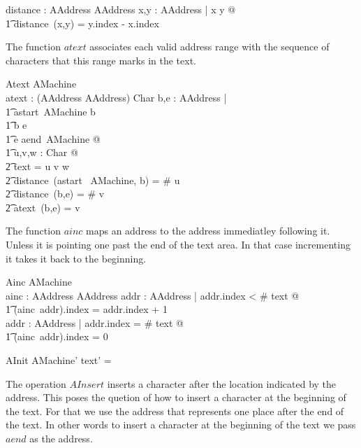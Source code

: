 \documentclass{article}
\begin{document}
\begin{axdef}
  distance : AAddress \cross AAddress \pfun \nat
\where
 \forall x,y : AAddress | x  y @ \\
\t1 distance~(x,y) = y.index - x.index
\end{axdef}

The function $atext$ associates each valid address range with the
sequence of characters that this range marks in the text.

\begin{schema}{Atext}
  AMachine \\
  atext : (AAddress \cross AAddress) \pfun \seq Char
\where
  \forall b,e : AAddress | \\
\t1 astart~\theta AMachine  b \land {} \\
\t1 b  e \land {} \\
\t1 e  aend~\theta AMachine @ \\
\t1 \exists u,v,w : \seq Char @ \\
\t2   text = u \cat v \cat w \land {} \\
\t2   distance~(astart~ \theta AMachine, b) = \# u \land {} \\
\t2   distance~(b,e) = \# v \land {} \\
\t2   atext~(b,e) = v
\end{schema}

The function $ainc$ maps an address to the address immediatley
following it. Unless it is pointing one past the end of the text
area. In that case incrementing it takes it back to the beginning.

\begin{schema}{Ainc}
  AMachine \\
  ainc : AAddress \fun AAddress
\where
  \forall addr : AAddress | addr.index < \# text @ \\
\t1 (ainc~addr).index = addr.index + 1 \\
  \forall addr : AAddress | addr.index = \# text @ \\
\t1 (ainc~addr).index = 0
\end{schema}

\begin{schema}{AInit}
  AMachine'
\where
  text' = \emptyset
\end{schema}

The operation $AInsert$ inserts a character after the location
indicated by the address. This poses the quetion of how to insert
a character at the beginning of the text. For that we use the address
that represents one place after the end of the text. In other words
to insert a character at the beginning of the text we pass $aend$
as the address.
\end{document}

